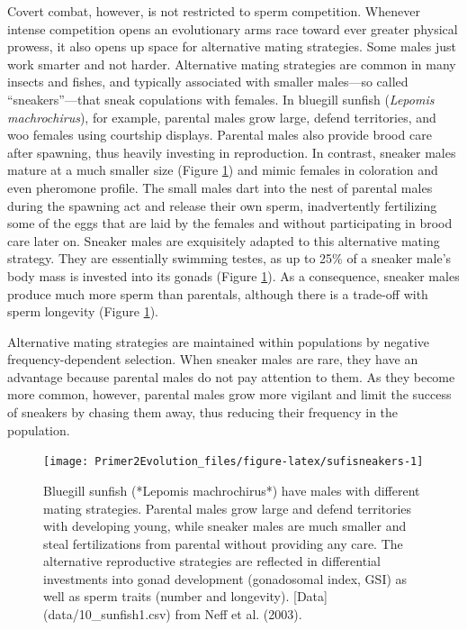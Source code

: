 \documentclass[
]{book}
\begin{document}
Covert combat, however, is not restricted to sperm competition. Whenever intense competition opens an evolutionary arms race toward ever greater physical prowess, it also opens up space for alternative mating strategies. Some males just work smarter and not harder. Alternative mating strategies are common in many insects and fishes, and typically associated with smaller males---so called ``sneakers''---that sneak copulations with females. In bluegill sunfish (\emph{Lepomis machrochirus}), for example, parental males grow large, defend territories, and woo females using courtship displays. Parental males also provide brood care after spawning, thus heavily investing in reproduction. In contrast, sneaker males mature at a much smaller size (Figure \ref{fig:sufisneakers}) and mimic females in coloration and even pheromone profile. The small males dart into the nest of parental males during the spawning act and release their own sperm, inadvertently fertilizing some of the eggs that are laid by the females and without participating in brood care later on. Sneaker males are exquisitely adapted to this alternative mating strategy. They are essentially swimming testes, as up to 25\% of a sneaker male's body mass is invested into its gonads (Figure \ref{fig:sufisneakers}). As a consequence, sneaker males produce much more sperm than parentals, although there is a trade-off with sperm longevity (Figure \ref{fig:sufisneakers}).

Alternative mating strategies are maintained within populations by negative frequency-dependent selection. When sneaker males are rare, they have an advantage because parental males do not pay attention to them. As they become more common, however, parental males grow more vigilant and limit the success of sneakers by chasing them away, thus reducing their frequency in the population.

\begin{figure}
\texttt{[image: Primer2Evolution\_files/figure-latex/sufisneakers-1]} \caption{Bluegill sunfish (*Lepomis machrochirus*) have males with different mating strategies. Parental males grow large and defend territories with developing young, while sneaker males are much smaller and steal fertilizations from parental without providing any care. The alternative reproductive strategies are reflected in differential investments into gonad development (gonadosomal index, GSI) as well as sperm traits (number and longevity). [Data](data/10_sunfish1.csv) from Neff et al. (2003).}\label{fig:sufisneakers}
\end{figure}
\end{document}
